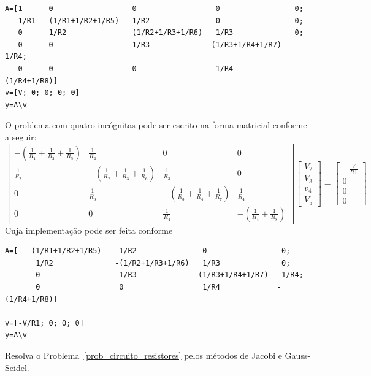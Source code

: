 \begin{resp}
\begin{verbatim}
A=[1      0                  0                  0                 0;
   1/R1  -(1/R1+1/R2+1/R5)   1/R2               0                 0;
   0      1/R2              -(1/R2+1/R3+1/R6)   1/R3              0;
   0      0                  1/R3             -(1/R3+1/R4+1/R7)   1/R4;
   0      0                  0                  1/R4             -(1/R4+1/R8)]
v=[V; 0; 0; 0; 0]
y=A\v
\end{verbatim}
O problema com quatro incógnitas pode ser escrito na forma matricial conforme a seguir:
\begin{equation}\left[\begin{array}{cccc}
-\left(\frac{1}{R_1}+\frac{1}{R_2}+\frac{1}{R_5}\right)&\frac{1}{R_2}&0&0\\[.5cm]
\frac{1}{R_2}&-\left(\frac{1}{R_2}+\frac{1}{R_3}+\frac{1}{R_6}\right)&\frac{1}{R_3}&0\\[.5cm]
0&\frac{1}{R_3}&-\left(\frac{1}{R_3}+\frac{1}{R_4}+\frac{1}{R_7}\right)&\frac{1}{R_4}\\[.5cm]
0&0&\frac{1}{R_4}&-\left(\frac{1}{R_4}+\frac{1}{R_8}\right)
\end{array}
\right]
\left[\begin{array}{c}
V_2\\[.65cm]
V_3\\[.65cm]
v_4\\[.65cm]
V_5
\end{array}
\right]=
\left[\begin{array}{c}
-\frac{V}{R1}\\[.65cm]
0\\[.65cm]
0\\[.65cm]
0
\end{array}
\right] \end{equation}
Cuja implementação pode ser feita conforme
\begin{verbatim}
A=[  -(1/R1+1/R2+1/R5)    1/R2               0                 0;
       1/R2              -(1/R2+1/R3+1/R6)   1/R3              0;
       0                  1/R3             -(1/R3+1/R4+1/R7)   1/R4;
       0                  0                  1/R4             -(1/R4+1/R8)]

v=[-V/R1; 0; 0; 0]
y=A\v
\end{verbatim}
\end{resp}
\fi

\begin{exer} Resolva o Problema~\ref{prob_circuito_resistores} pelos métodos de Jacobi e Gauss-Seidel.
\end{exer}


